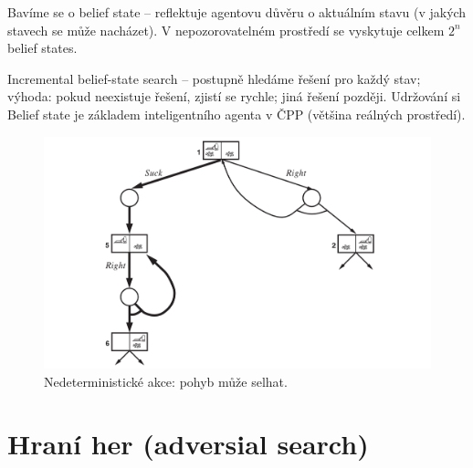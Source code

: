 \begin{compactitem}
    \item Bavíme se o belief state -- reflektuje agentovu důvěru o aktuálním stavu (v jakých stavech se může nacházet). V nepozorovatelném prostředí se vyskytuje celkem $2^n$ belief states.

    \item Incremental belief-state search -- postupně hledáme řešení pro každý stav; výhoda: pokud neexistuje řešení, zjistí se rychle; jiná řešení později. Udržování si Belief state je základem inteligentního agenta v ČPP (většina reálných prostředí).

    \begin{figure}[H]
        \centering
        \includegraphics[width=1\linewidth]{nedeterministicke_akce.png}
        \caption{Nedeterministické akce: pohyb může selhat.}
    \end{figure}
\end{compactitem}


\section{Hraní her (adversial search)}

